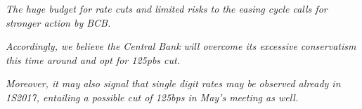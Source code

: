 \documentclass{report}
\date{}
\title{}
\begin{document}
\thispagestyle{firstpagestyle}
\JournalIssue
    \begin{tcolorbox}[colbak=red!5!white, colframe=red!0!white]
      \begin{compactitem}
      \item \textit{The huge budget for rate cuts and limited risks to the easing cycle calls for stronger action by BCB.}
      \item \textit{Accordingly, we believe the Central Bank will overcome its excessive conservatism this time around and opt for 125pbs cut.}
      \item \textit{Moreover, it may also signal that single digit rates may be observed already in 1S2017, entailing a possible cut of 125bps in May's meeting as well.}
      \end{compactitem}
    \end{tcolorbox}
\vspace{-0.5cm}
\end{document}

